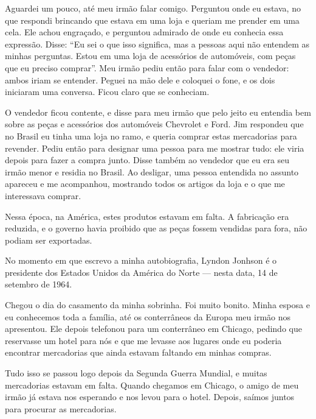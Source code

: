 Aguardei um pouco, até meu irmão falar comigo. Perguntou
onde eu estava, no que respondi brincando que estava em uma loja e queriam me
prender em uma cela. Ele achou engraçado, e perguntou admirado de onde eu
conhecia essa expressão. Disse: ``Eu sei o que isso significa, mas a
pessoas aqui não entendem as minhas perguntas. Estou em uma loja de
acessórios de automóveis, com peças que eu preciso comprar''. 
Meu irmão pediu então para falar com o vendedor: ambos iriam se entender. 
Peguei na mão dele e coloquei o fone, e os
dois iniciaram uma conversa. Ficou claro que se conheciam.

O vendedor ficou contente, e disse para meu irmão que pelo jeito
eu entendia bem sobre as peças e acessórios dos automóveis Chevrolet e
Ford. Jim respondeu que no Brasil eu tinha uma loja no ramo, e queria
comprar estas mercadorias para revender. Pediu então para designar uma pessoa
para me mostrar tudo: ele viria depois para fazer a compra junto.
Disse também ao vendedor que eu era seu irmão menor e residia no Brasil.
Ao desligar, uma pessoa entendida no assunto apareceu e me acompanhou, mostrando todos os
artigos da loja e o que me interessava comprar.

Nessa época, na América, estes produtos estavam em falta. A fabricação era
reduzida, e o governo havia proibido que as peças fossem vendidas para
fora, não podiam ser exportadas.


No momento em que escrevo a minha autobiografia, Lyndon
Jonhson é o presidente dos Estados Unidos da América do Norte --- nesta
data, 14 de setembro de 1964.

Chegou o dia do casamento da minha sobrinha. Foi muito bonito. Minha
esposa e eu conhecemos toda a família, até os conterrâneos da Europa
meu irmão nos apresentou. Ele depois telefonou para um conterrâneo
em Chicago, pedindo que reservasse um hotel para nós e que me levasse
aos lugares onde eu poderia encontrar mercadorias que ainda estavam
faltando em minhas compras. 

Tudo isso se passou logo depois da Segunda Guerra Mundial, e muitas mercadorias estavam em falta. Quando chegamos em Chicago, o amigo de meu irmão já estava nos esperando e nos
levou para o hotel. Depois, saímos juntos para procurar as mercadorias.

